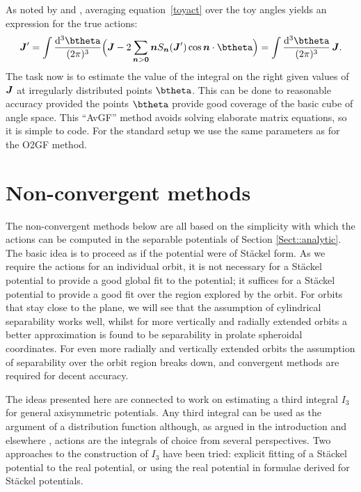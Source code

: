 \documentclass[useAMS,usenatbib,fleqn,a4paper]{mn2e}
\newcommand{\bs}[1]{\bmath{#1}}
\begin{document}
As noted by \cite{Bovy2014} and \cite{Fox2014}, averaging
equation~\eqref{toyact} over the toy angles yields an expression for the
true actions:
\begin{equation}
\bs{J}'=\int{\mathrm{d}^3\btheta\over(2\pi)^3}
\Big(\boldsymbol{J}-2\sum_{\bs{n}>\bs{0}}\bs{n}S_{\bs{n}}(\bs{J}')\cos\bs{n}\cdot\btheta\Big)
=\int{\mathrm{d}^3\btheta\over(2\pi)^3}\,\boldsymbol{J}.
\end{equation}
 The task now is to estimate the value of the integral on the right given values
of $\bs{J}$ at irregularly distributed points $\btheta$. This can be done to
reasonable accuracy provided the points $\btheta$ provide good coverage of
the basic cube of angle space. This ``AvGF'' method avoids solving elaborate matrix
equations, so it is simple to code. For the standard setup we use the same
parameters as for the O2GF method.

\section{Non-convergent methods}\label{Sect::MethodsNC}

The non-convergent methods below are all based on the simplicity with
which the actions can be computed in the separable potentials of 
Section \ref{Sect::analytic}. The basic idea is to proceed as if the potential were of St\"ackel
form. As we require the actions for an individual orbit, it is not necessary
for a St\"ackel potential to provide a good global fit to the potential; it
suffices for a St\"ackel potential to provide a good fit over the region
explored by the orbit. For orbits that stay close to the plane, we will see that the
assumption of cylindrical separability works well, whilst for more vertically
and radially extended orbits a better approximation is found to be
separability in prolate spheroidal coordinates.  For even more radially and
vertically extended orbits the assumption of separability over the orbit
region breaks down, and convergent methods are required for decent accuracy.

The ideas presented here are connected to work on estimating a third
integral $I_3$ for general axisymmetric potentials. Any third integral can be
used as the argument of a distribution function although, as argued in the
introduction and elsewhere \citep[e.g.][]{BinneyMcMillan2015}, actions are
the integrals of choice from several perspectives. Two approaches to the
construction of $I_3$ have been tried: explicit fitting of a St\"ackel
potential to the real potential, or using the real potential in formulae
derived for St\"ackel potentials. 
\end{document}
